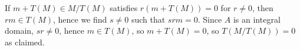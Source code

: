 If $m + T(M) \in M/T(M)$ satisfies $r(m + T(M)) = 0$ for $r\neq 0$, then
$rm \in T(M)$, hence we find $s\neq 0$ such that $srm = 0$. Since $A$ is an
integral domain, $sr\neq 0$, hence $m \in T(M)$, so $m + T(M) = 0$, so
$T(M/T(M)) = 0$ as claimed.
